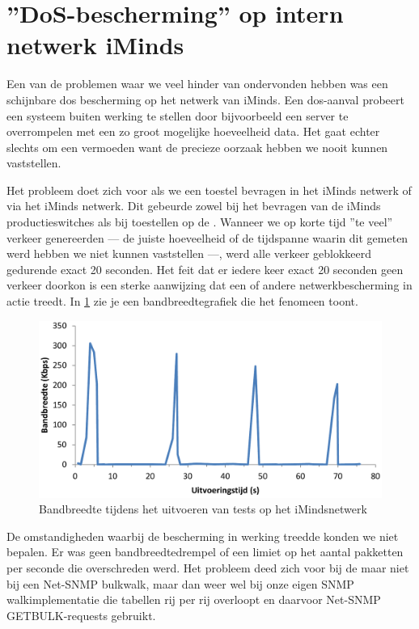 \section{''DoS-bescherming'' op intern netwerk iMinds}
\label{probleem-dos-bescherming}


Een van de problemen waar we veel hinder van ondervonden hebben was een schijnbare \gls{dos} bescherming op het netwerk van iMinds.
Een \gls{dos}-aanval probeert een systeem buiten werking te stellen door bijvoorbeeld een server te overrompelen met een zo groot mogelijke hoeveelheid data.
Het gaat echter slechts om een vermoeden want de precieze oorzaak hebben we nooit kunnen vaststellen.

Het probleem doet zich voor als we een toestel bevragen in het iMinds netwerk of via het iMinds netwerk.
Dit gebeurde zowel bij het bevragen van de iMinds productieswitches als bij toestellen op de \vwall{}.
Wanneer we op korte tijd ''te veel'' verkeer genereerden --- de juiste hoeveelheid of de tijdspanne waarin dit gemeten werd hebben we niet kunnen vaststellen ---, werd alle verkeer geblokkeerd gedurende exact 20 seconden.
Het feit dat er iedere keer exact 20 seconden geen verkeer doorkon is een sterke aanwijzing dat een of andere netwerkbescherming in actie treedt.
In \cref{fig-dos-bescherming} zie je een bandbreedtegrafiek die het fenomeen toont.

\begin{figure}[h]
	\centering
	\includegraphics[scale=0.40]{figures/dos-bescherming}
	\caption{Bandbreedte tijdens het uitvoeren van tests op het iMindsnetwerk}
	\label{fig-dos-bescherming}
\end{figure}

De omstandigheden waarbij de bescherming in werking treedde konden we niet bepalen.
Er was geen bandbreedtedrempel of een limiet op het aantal pakketten per seconde die overschreden werd.
Het probleem deed zich voor bij de \nwmretriever{} maar niet bij een Net-SNMP bulkwalk,
maar dan weer wel bij onze eigen SNMP walkimplementatie die tabellen rij per rij overloopt en daarvoor Net-SNMP GETBULK-requests gebruikt.


